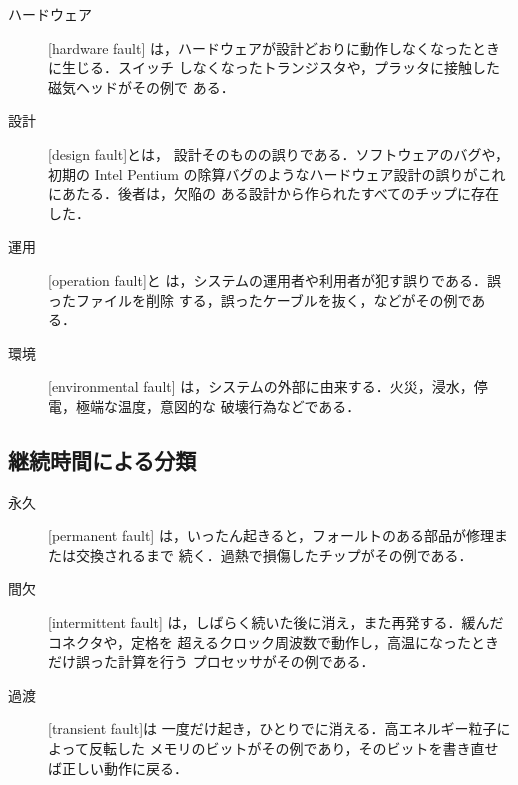 \documentclass[../main.tex]{subfiles}
\begin{document}
\begin{description}
  \item[ハードウェア] [hardware fault]%
    は，ハードウェアが設計どおりに動作しなくなったときに生じる．スイッチ
    しなくなったトランジスタや，プラッタに接触した磁気ヘッドがその例で
    ある．
  \item[設計] [design fault]とは，
    設計そのものの誤りである．ソフトウェアのバグや，初期の Intel Pentium
    の除算バグのようなハードウェア設計の誤りがこれにあたる．後者は，欠陥の
    ある設計から作られたすべてのチップに存在した．
  \item[運用] [operation fault]と
    は，システムの運用者や利用者が犯す誤りである．誤ったファイルを削除
    する，誤ったケーブルを抜く，などがその例である．
  \item[環境] [environmental fault]%
    は，システムの外部に由来する．火災，浸水，停電，極端な温度，意図的な
    破壊行為などである．
\end{description}

\subsection{継続時間による分類}

\begin{description}
  \item[永久] [permanent fault]%
    は，いったん起きると，フォールトのある部品が修理または交換されるまで
    続く．過熱で損傷したチップがその例である．
  \item[間欠] [intermittent fault]%
    は，しばらく続いた後に消え，また再発する．緩んだコネクタや，定格を
    超えるクロック周波数で動作し，高温になったときだけ誤った計算を行う
    プロセッサがその例である．
  \item[過渡] [transient fault]は
    一度だけ起き，ひとりでに消える．高エネルギー粒子によって反転した
    メモリのビットがその例であり，そのビットを書き直せば正しい動作に戻る．
\end{description}
\end{document}
